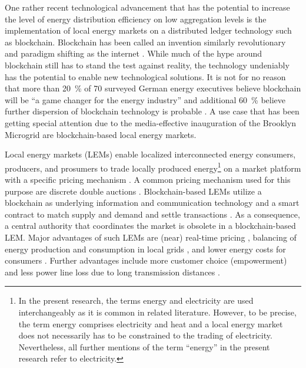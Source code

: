One rather recent technological advancement that has the potential to increase the level of energy distribution efficiency on low aggregation levels is the implementation of local energy markets on a distributed ledger technology such as blockchain. Blockchain has been called an invention similarly revolutionary and paradigm shifting as the internet \citep{Swan:2015}. While much of the hype around blockchain still has to stand the test against reality, the technology undeniably has the potential to enable new technological solutions. It is not for no reason that more than 20~\% of 70 surveyed German energy executives believe blockchain will be “a game changer for the energy industry” and additional 60~\% believe further dispersion of blockchain technology is probable \citep{Burger:2016}. A use case that has been getting special attention due to the media-effective inauguration of the Brooklyn Microgrid \citep{newscientist:2016} are blockchain-based local energy markets.

Local energy markets (LEMs) enable localized interconnected energy consumers, producers, and prosumers to trade locally produced energy\footnote{In the present research, the terms energy and electricity are used interchangeably as it is common in related literature. However, to be precise, the term energy comprises electricity and heat and a local energy market does not necessarily has to be constrained to the trading of electricity. Nevertheless, all further mentions of the term ``energy'' in the present research refer to electricity.} on a market platform with a specific pricing mechanism \citep{Mengelkamp:2018a}. A common pricing mechanism used for this purpose are discrete double auctions \citep{Lamparter:2010, Buchmann:2013, Block:2008}.  Blockchain-based LEMs utilize a blockchain as underlying information and communication technology and a smart contract to match supply and demand and settle transactions \citep{Mengelkamp:2018b}. As a consequence, a central authority that coordinates the market is obsolete in a blockchain-based LEM. Major advantages of such LEMs are (near) real-time pricing \citep{Mihaylov:2014}, balancing of energy production and consumption in local grids \citep{Stadler:2016}, and lower energy costs for consumers \citep{Mengelkamp:2018agentstrategies}. Further advantages include more customer choice (empowerment) \citep{Koirala:2016} and less power line loss due to long transmission distances \citep{Hvelplund:2006}.

